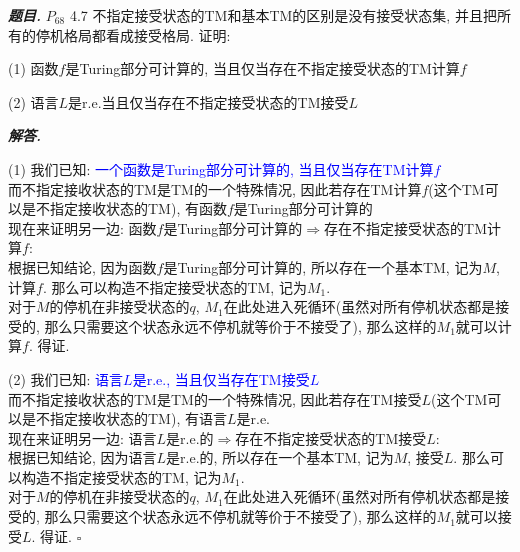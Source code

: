 \documentclass[10pt, a4paper, oneside]{ctexart}
\newenvironment{problem}{\begin{framed}\par\noindent\textbf{\textit{题目. }}}{\end{framed}\par}
\newenvironment{solution}{%
  \par\noindent\textbf{\textit{解答. }}\ignorespaces
}{%
  \hfill\ensuremath{\square}\par %
}
\begin{document}
        \begin{problem}
        $P_{68}$ 4.7 不指定接受状态的TM和基本TM的区别是没有接受状态集, 并且把所有的停机格局都看成接受格局. 证明:
        
        (1) 函数$f$是Turing部分可计算的, 当且仅当存在不指定接受状态的TM计算$f$
        
        (2) 语言$L$是r.e.当且仅当存在不指定接受状态的TM接受$L$
        \end{problem}
        \begin{solution}
        (1) 我们已知: \textcolor{blue}{一个函数是Turing部分可计算的, 当且仅当存在TM计算$f$}\\
        而不指定接收状态的TM是TM的一个特殊情况, 因此若存在TM计算$f$(这个TM可以是不指定接收状态的TM), 有函数$f$是Turing部分可计算的\\
        现在来证明另一边: 函数$f$是Turing部分可计算的$\Rightarrow$存在不指定接受状态的TM计算$f$:\\
        根据已知结论, 因为函数$f$是Turing部分可计算的, 所以存在一个基本TM, 记为$M$, 计算$f$. 那么可以构造不指定接受状态的TM, 记为$M_1$.\\
        对于$M$的停机在非接受状态的$q$, $M_1$在此处进入死循环(虽然对所有停机状态都是接受的, 那么只需要这个状态永远不停机就等价于不接受了), 那么这样的$M_1$就可以计算$f$. 得证.
        
        (2) 我们已知: \textcolor{blue}{语言$L$是r.e., 当且仅当存在TM接受$L$}\\
        而不指定接收状态的TM是TM的一个特殊情况, 因此若存在TM接受$L$(这个TM可以是不指定接收状态的TM), 有语言$L$是r.e.\\
        现在来证明另一边: 语言$L$是r.e.的$\Rightarrow$存在不指定接受状态的TM接受$L$:\\
        根据已知结论, 因为语言$L$是r.e.的, 所以存在一个基本TM, 记为$M$, 接受$L$. 那么可以构造不指定接受状态的TM, 记为$M_1$.\\
        对于$M$的停机在非接受状态的$q$, $M_1$在此处进入死循环(虽然对所有停机状态都是接受的, 那么只需要这个状态永远不停机就等价于不接受了), 那么这样的$M_1$就可以接受$L$. 得证.
        \end{solution}
        
\end{document}
